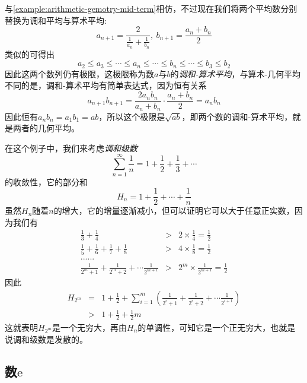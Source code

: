 \begin{example}[调和-算术中项]
  \label{example:harmonic-arithmetic-mid-term}
  与\autoref{example:arithmetic-gemotry-mid-term}相仿，不过现在我们将两个平均数分别替换为调和平均与算术平均:
  \[ a_{n+1} = \frac{2}{\frac{1}{a_n}+\frac{1}{b_n}}, \  b_{n+1} = \frac{a_n+b_n}{2} \]
  类似的可得出
  \[ a_2 \leqslant a_3 \leqslant \cdots \leqslant a_n \leqslant \cdots \leqslant b_n \leqslant \cdots \leqslant b_3 \leqslant b_2  \]
  因此这两个数列仍有极限，这极限称为数$a$与$b$的\emph{调和-算术平均}，与算术-几何平均不同的是，调和-算术平均有简单表达式，因为恒有关系
  \[ a_{n+1}b_{n+1} = \frac{2a_nb_n}{a_n+b_n} \cdot \frac{a_n+b_n}{2} = a_nb_n \]
  因此恒有$a_nb_n=a_1b_1=ab$，所以这个极限是$\sqrt{ab}$，即两个数的调和-算术平均，就是两者的几何平均。
\end{example}

\begin{example}[调和级数的发散性]
  \label{example:non-convergency-of-harmonic-series-proof-by-monotone}
  在这个例子中，我们来考虑\emph{调和级数}
  \[ \sum_{n=1}^{\infty} \frac{1}{n} = 1+\frac{1}{2} + \frac{1}{3} + \cdots  \]
  的收敛性，它的部分和
  \[ H_n = 1 + \frac{1}{2} + \cdots + \frac{1}{n} \]
  虽然$H_n$随着$n$的增大，它的增量逐渐减小，但可以证明它可以大于任意正实数，因为我们有
  \begin{eqnarray*}
    \frac{1}{3} + \frac{1}{4} & > & 2 \times \frac{1}{4} = \frac{1}{2} \\
    \frac{1}{5} + \frac{1}{6} + \frac{1}{7} + \frac{1}{8} & > & 4 \times \frac{1}{8} = \frac{1}{2} \\
    ...... && \\
    \frac{1}{2^m+1} + \frac{1}{2^m+2} + \cdots \frac{1}{2^{m+1}} & > & 2^m \times \frac{1}{2^{m+1}} = \frac{1}{2}
  \end{eqnarray*}
  因此
  \begin{eqnarray*}
    H_{2^m} & = & 1+ \frac{1}{2} + \sum_{i=1}^m \left( \frac{1}{2^i+1} + \frac{1}{2^i+2} + \cdots \frac{1}{2^{i+1}} \right) \\
    & > & 1 + \frac{1}{2} + \frac{1}{2}m
  \end{eqnarray*}
  这就表明$H_{2^m}$是一个无穷大，再由$H_n$的单调性，可知它是一个正无穷大，也就是说调和级数是发散的。
\end{example}

\subsection{数$\mathrm{e}$}
\label{sec:a-import-sequence-limit}

